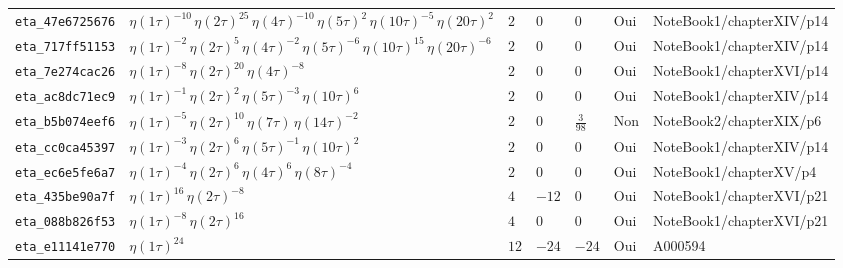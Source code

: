 \documentclass[11pt,twoside,openright]{book}
\begin{document}
\begin{longtable}{p{2.3cm}p{4.3cm}llllp{2.3cm}}
\texttt{eta\_47e6725676} & $\eta(1\tau)^{-10}\, \eta(2\tau)^{25}\, \eta(4\tau)^{-10}\, \eta(5\tau)^{2}\, \eta(10\tau)^{-5}\, \eta(20\tau)^{2}$ & $2$ & $0$ & $0$ & Oui & NoteBook1/chapterXIV/p14 \\
\texttt{eta\_717ff51153} & $\eta(1\tau)^{-2}\, \eta(2\tau)^{5}\, \eta(4\tau)^{-2}\, \eta(5\tau)^{-6}\, \eta(10\tau)^{15}\, \eta(20\tau)^{-6}$ & $2$ & $0$ & $0$ & Oui & NoteBook1/chapterXIV/p14 \\
\texttt{eta\_7e274cac26} & $\eta(1\tau)^{-8}\, \eta(2\tau)^{20}\, \eta(4\tau)^{-8}$ & $2$ & $0$ & $0$ & Oui & NoteBook1/chapterXVI/p14 \\
\texttt{eta\_ac8dc71ec9} & $\eta(1\tau)^{-1}\, \eta(2\tau)^{2}\, \eta(5\tau)^{-3}\, \eta(10\tau)^{6}$ & $2$ & $0$ & $0$ & Oui & NoteBook1/chapterXIV/p14 \\
\texttt{eta\_b5b074eef6} & $\eta(1\tau)^{-5}\, \eta(2\tau)^{10}\, \eta(7\tau)\, \eta(14\tau)^{-2}$ & $2$ & $0$ & $\frac{3}{98}$ & Non & NoteBook2/chapterXIX/p6 \\
\texttt{eta\_cc0ca45397} & $\eta(1\tau)^{-3}\, \eta(2\tau)^{6}\, \eta(5\tau)^{-1}\, \eta(10\tau)^{2}$ & $2$ & $0$ & $0$ & Oui & NoteBook1/chapterXIV/p14 \\
\texttt{eta\_ec6e5fe6a7} & $\eta(1\tau)^{-4}\, \eta(2\tau)^{6}\, \eta(4\tau)^{6}\, \eta(8\tau)^{-4}$ & $2$ & $0$ & $0$ & Oui & NoteBook1/chapterXV/p4 \\
\texttt{eta\_435be90a7f} & $\eta(1\tau)^{16}\, \eta(2\tau)^{-8}$ & $4$ & $-12$ & $0$ & Oui & NoteBook1/chapterXVI/p21 \\
\texttt{eta\_088b826f53} & $\eta(1\tau)^{-8}\, \eta(2\tau)^{16}$ & $4$ & $0$ & $0$ & Oui & NoteBook1/chapterXVI/p21 \\
\texttt{eta\_e11141e770} & $\eta(1\tau)^{24}$ & $12$ & $-24$ & $-24$ & Oui & A000594 \\
\bottomrule
\end{longtable}
\end{document}
